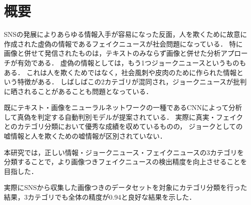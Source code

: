 \chapter{概要}

SNSの発展によりあらゆる情報入手が容易になった反面，人を欺くために故意に作成された虚偽の情報であるフェイクニュースが社会問題になっている．
特に画像と併せて発信されたものは，テキストのみならず画像と併せた分析アプローチが有効である．
虚偽の情報としては，もう1つジョークニュースというものもある．
これは人を欺くためではなく，社会風刺や皮肉のために作られた情報という特徴がある．
しばしばこの2カテゴリが混同され，ジョークニュースが批判に晒されることがあることも問題となっている．

既にテキスト・画像をニューラルネットワークの一種であるCNNによって分析して真偽を判定する自動判別モデルが提案されている．
実際に真実・フェイクとのカテゴリ分類において優秀な成績を収めているものの，
ジョークとしての嘘情報と人を欺くための嘘情報が区別されていない．


本研究では，正しい情報・ジョークニュース・フェイクニュースの3カテゴリを分類することで，より画像つきフェイクニュースの検出精度を向上させることを目指した．


実際にSNSから収集した画像つきのデータセットを対象にカテゴリ分類を行った結果，3カテゴリでも全体の精度が0.94と良好な結果を示した．



%